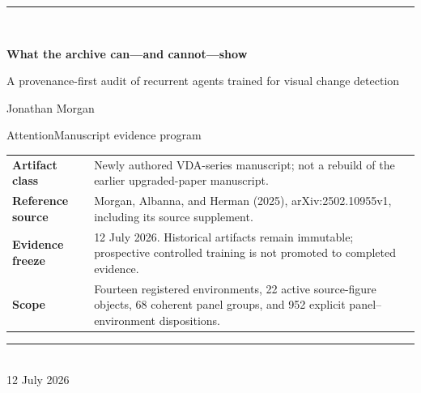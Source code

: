 \documentclass[11pt,a4paper]{article}
\begin{document}
\begin{titlepage}
\thispagestyle{empty}
\vspace*{18mm}
{\color{VdaBlue}\rule{\textwidth}{2.2pt}}\\[10mm]
{\fontsize{28}{33}\selectfont\bfseries What the archive can---and cannot---show\par}
\vspace{5mm}
{\fontsize{17}{22}\selectfont A provenance-first audit of recurrent agents trained for visual change detection\par}
\vspace{16mm}
{\large Jonathan Morgan\par}
\vspace{2mm}
{\normalsize AttentionManuscript evidence program\par}
\vfill
\begin{tabularx}{\textwidth}{@{}lY@{}}
\toprule
\textbf{Artifact class} & Newly authored VDA-series manuscript; not a rebuild of the earlier upgraded-paper manuscript.\\
\textbf{Reference source} & Morgan, Albanna, and Herman (2025), arXiv:2502.10955v1, including its source supplement.\\
\textbf{Evidence freeze} & 12 July 2026. Historical artifacts remain immutable; prospective controlled training is not promoted to completed evidence.\\
\textbf{Scope} & Fourteen registered environments, 22 active source-figure objects, 68 coherent panel groups, and 952 explicit panel--environment dispositions.\\
\bottomrule
\end{tabularx}
\vfill
{\color{VdaBlue}\rule{\textwidth}{2.2pt}}\\[3mm]
{\small 12 July 2026}
\end{titlepage}

\begin{abstract}
A spatial cue can make an agent report ``change'' more often because discrimination improves or because the decision criterion becomes more liberal. Response curves alone cannot separate those explanations. This audit asks which behavioral, representational, and model-intervention claims survive when every result is tied to an explicit task, checkpoint, and evidence class. It separates deterministic task specifications, documentation of the inspected implementation, historical aggregate records, and new checkpoint recomputations. The matched battery compares five pairs of separately trained agents with either 128 or 256 recurrent coordinates at each spatial location. Their behavioral, readout, and intervention differences change direction across pairs; there is no consistent wider-is-better pattern. Held-out probes can read whether a change occurred and, where defined, its location at the final timestep. A direct bias to cue-related routing keys changes sensitivity within individual checkpoints. Because the paired checkpoints were trained separately and response criterion is not analyzed here, these results do not estimate a causal width effect, population or seed variation, human capacity, or biological mechanism.
\end{abstract}
\end{document}
